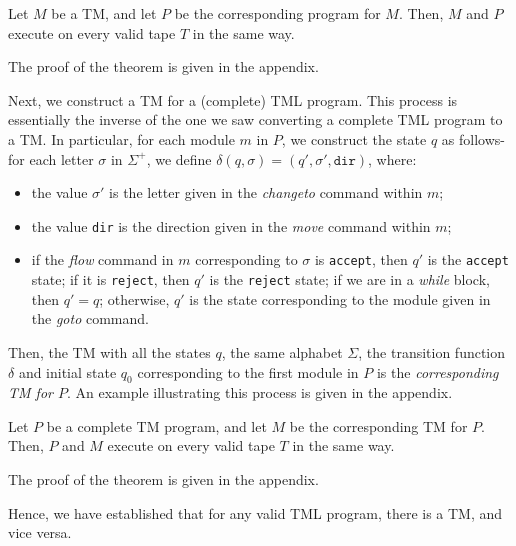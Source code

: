 \begin{theorem}
    Let $M$ be a TM, and let $P$ be the corresponding program for $M$. Then, $M$ and $P$ execute on every valid tape $T$ in the same way. 
\end{theorem}
The proof of the theorem is given in the appendix.

Next, we construct a TM for a (complete) TML program. This process is essentially the inverse of the one we saw converting a complete TML program to a TM. In particular, for each module $m$ in $P$, we construct the state $q$ as follows- for each letter $\sigma$ in $\Sigma^+$, we define $\delta(q, \sigma) = (q', \sigma', \texttt{dir})$, where:
\begin{itemize}
    \item the value $\sigma'$ is the letter given in the \textit{changeto} command within $m$;
    \item the value \texttt{dir} is the direction given in the \textit{move} command within $m$;
    \item if the \textit{flow} command in $m$ corresponding to $\sigma$ is \texttt{accept}, then $q'$ is the \texttt{accept} state; if it is \texttt{reject}, then $q'$ is the \texttt{reject} state; if we are in a \textit{while} block, then $q' = q$; otherwise, $q'$ is the state corresponding to the module given in the \textit{goto} command.
\end{itemize}
Then, the TM with all the states $q$, the same alphabet $\Sigma$, the transition function $\delta$ and initial state $q_0$ corresponding to the first module in $P$ is the \emph{corresponding TM for $P$}. An example illustrating this process is given in the appendix.

\begin{theorem}
    Let $P$ be a complete TM program, and let $M$ be the corresponding TM for $P$. Then, $P$ and $M$ execute on every valid tape $T$ in the same way.
\end{theorem}
The proof of the theorem is given in the appendix.

Hence, we have established that for any valid TML program, there is a TM, and vice versa.
